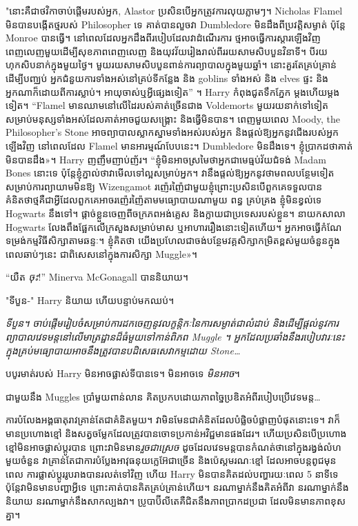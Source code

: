 {"នោះគឺជាថវិកាចាប់ផ្តើមរបស់អ្នក, Alastor ប្រសិនបើអ្នកត្រូវការលុយភ្លាមៗ។ Nicholas Flamel មិនបានបង្កើតថ្មរបស់ Philosopher ទេ គាត់បានលួចវា Dumbledore មិនដឹងពីប្រវត្តិសម្ងាត់ ប៉ុន្តែ Monroe បានធ្វើ។ នៅពេលដែលអ្នកដឹងពីរបៀបដែលវាដំណើរការ ថ្មអាចធ្វើការស្ដារឡើងវិញពេញលេញមួយដើម្បីសុខភាពពេញលេញ និងយុវវ័យរៀងរាល់ពីររយសាមសិបបួនវិនាទី។ បីរយហុកសិបនាក់ក្នុងមួយថ្ងៃ។ មួយរយសាមសិបបួនពាន់ការព្យាបាលក្នុងមួយឆ្នាំ។ នោះគួរតែគ្រប់គ្រាន់ដើម្បីបញ្ឈប់ អ្នកជំនួយការទាំងអស់នៅគ្រប់ទីកន្លែង និង goblins ទាំងអស់ និង elves ផ្ទះ និងអ្នកណាក៏ដោយពីការស្លាប់។ អាយុចាស់ឬអ្វីផ្សេងទៀត” ។ Harry កំពុងជូតទឹកភ្នែក ម្តងហើយម្តងទៀត។ “Flamel មានឈាមនៅលើដៃរបស់គាត់ច្រើនជាង Voldemorts មួយរយនាក់ទៅទៀត សម្រាប់មនុស្សទាំងអស់ដែលគាត់អាចជួយសង្គ្រោះ និងធ្វើមិនបាន។ ពេញមួយពេល Moody, the Philosopher's Stone អាចព្យាបាលស្លាកស្នាមទាំងអស់របស់អ្នក និងផ្តល់ឱ្យអ្នកនូវជើងរបស់អ្នកឡើងវិញ នៅពេលដែល Flamel មានអារម្មណ៍បែបនេះ។ Dumbledore មិនដឹងទេ។ ខ្ញុំ​ប្រាកដ​ថា​គាត់​មិន​បាន​ដឹង»។ Harry ញញឹមញាប់ញ័រ។ “ខ្ញុំមិនអាចស្រមៃថាអ្នកជាមេធ្មប់វ័យជំទង់ Madam Bones នោះទេ ប៉ុន្តែខ្ញុំភ្នាល់ថាវាមើលទៅល្អសម្រាប់អ្នក។ វានឹងផ្តល់ឱ្យអ្នកនូវថាមពលបន្ថែមទៀតសម្រាប់ការព្យាយាមមិនឱ្យ Wizengamot រញ៉េរញ៉ៃជាមួយខ្ញុំព្រោះប្រសិនបើពួកគេទទួលបានគំនិតថាថ្មគឺជាអ្វីដែលពួកគេអាចរញ៉េរញ៉ៃតាមមធ្យោបាយណាមួយ ពន្ធ គ្រប់គ្រង ខ្ញុំមិនខ្វល់ទេ Hogwarts នឹងទៅ។ ផ្តាច់ខ្លួនចេញពីចក្រភពអង់គ្លេស និងក្លាយជាប្រទេសរបស់ខ្លួន។ នាយកសាលា Hogwarts លែងពឹងផ្អែកលើក្រសួងសម្រាប់មាស ឬអាហាររឿងនោះទៀតហើយ។ អ្នកអាចធ្វើកំណែទម្រង់កម្មវិធីសិក្សាតាមឆន្ទៈ។ ខ្ញុំ​គិត​ថា យើង​ប្រហែល​ជា​ចង់​បន្ថែម​វគ្គ​សិក្សា​កម្រិត​ខ្ពស់​មួយ​ចំនួន​ក្នុង​ពេល​ឆាប់​ៗ​នេះ ជា​ពិសេស​នៅ​ក្នុង​ការ​សិក្សា Muggle»។

“យឺត \emph{ចុះ}!” Minerva McGonagall បាននិយាយ។

"ទីបួន-" Harry និយាយ ហើយបន្ទាប់មកឈប់។

\emph{ទីបួន។ ចាប់ផ្តើមរៀបចំសម្រាប់ការដកចេញនូវលក្ខន្តិកៈនៃការសម្ងាត់ជាលំដាប់ និងដើម្បីផ្តល់នូវការព្យាបាលវេទមន្តនៅលើមាត្រដ្ឋានដ៏ធំមួយទៅកាន់ពិភព Muggle ។ អ្នក​ដែល​ប្រឆាំង​នឹង​របៀបវារៈ​នេះ​ក្នុង​គ្រប់​មធ្យោបាយ​អាច​នឹង​ត្រូវ​បាន​បដិសេធ​សេវាកម្ម​ដោយ Stone…}

បបូរមាត់របស់ Harry មិនអាចផ្លាស់ទីបានទេ។ មិនអាចទេ \emph{មិនអាច}។

ជាមួយនឹង Muggles ប្រាំមួយពាន់លាន គិតប្រកបដោយភាពច្នៃប្រឌិតអំពីរបៀបប្រើវេទមន្ត…

ការបំលែងអង្គធាតុរាវគ្រាន់តែជាគំនិតមួយ។ វាមិនមែនជាគំនិតដែលបំផ្លិចបំផ្លាញបំផុតនោះទេ។ វាក៏មានប្រហោងខ្មៅ និងសត្វចម្លែកដែលត្រូវបានចោទប្រកាន់អវិជ្ជមានផងដែរ។ ហើយប្រសិនបើប្រហោងខ្មៅមិនអាចផ្លាស់ប្តូរបាន ព្រោះវាមិនមាន\emph{រួចជាស្រេច} ដូចដែលវេទមន្តបានកំណត់ថានៅក្នុងរង្វង់លំហមួយចំនួន វាគ្រាន់តែជាការបំប្លែងអាវុធនុយក្លេអ៊ែជាច្រើន និងប៉េស្តមរណៈខ្មៅ ដែលអាចបន្តពូជមុនពេល ការផ្លាស់ប្តូររូបរាងបានរលត់ទៅវិញ ហើយ Harry មិនបានគិតដល់បញ្ហារយៈពេល 5 នាទីទេ ប៉ុន្តែវាមិនមានបញ្ហាអ្វីទេ ព្រោះគាត់បានគិតគ្រប់គ្រាន់ហើយ។ នរណាម្នាក់នឹងគិតអំពីវា នរណាម្នាក់នឹងនិយាយ នរណាម្នាក់នឹងសាកល្បងវា។ ប្រូបាប៊ីលីតេគឺជិតនឹងភាពប្រាកដប្រជា ដែលមិនមានភាពខុសគ្នា។

}
